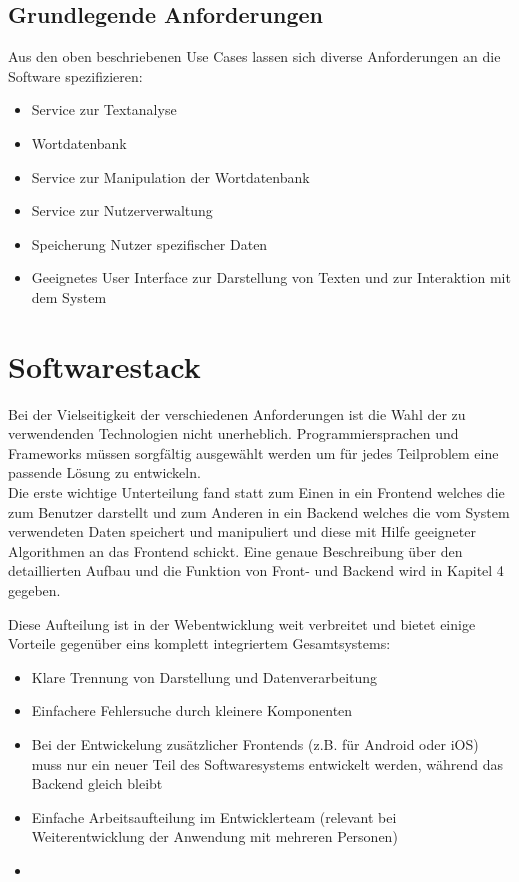 \subsection*{Grundlegende Anforderungen}

Aus den oben beschriebenen Use Cases lassen sich diverse Anforderungen an die Software spezifizieren:

\begin{itemize}
	\item Service zur Textanalyse
	\item Wortdatenbank
	\item Service zur Manipulation der Wortdatenbank
	\item Service zur Nutzerverwaltung
	\item Speicherung Nutzer spezifischer Daten
	\item Geeignetes User Interface zur Darstellung von Texten und zur Interaktion mit dem System
\end{itemize}




\section{Softwarestack}

Bei der Vielseitigkeit der verschiedenen Anforderungen ist die Wahl der zu verwendenden Technologien nicht unerheblich. Programmiersprachen und Frameworks müssen sorgfältig ausgewählt werden um für jedes Teilproblem eine passende Lösung zu entwickeln.\\
Die erste wichtige Unterteilung fand statt zum Einen in ein Frontend welches die zum Benutzer darstellt und zum Anderen in ein Backend welches die vom System verwendeten Daten speichert und manipuliert und diese mit Hilfe geeigneter Algorithmen an das Frontend schickt. Eine genaue Beschreibung über den detaillierten Aufbau und die Funktion von Front- und Backend wird in Kapitel 4 gegeben.\\


Diese Aufteilung ist in der Webentwicklung weit verbreitet  und bietet einige Vorteile gegenüber eins komplett integriertem Gesamtsystems:

\begin{itemize}
	\item Klare Trennung von Darstellung und Datenverarbeitung
	\item Einfachere Fehlersuche durch kleinere Komponenten
	\item Bei der Entwickelung zusätzlicher Frontends (z.B. für Android oder iOS) muss nur ein neuer Teil des Softwaresystems entwickelt werden, während das Backend gleich bleibt
	\item Einfache Arbeitsaufteilung im Entwicklerteam (relevant bei Weiterentwicklung der Anwendung mit mehreren Personen)
	\item {}
\end{itemize}

